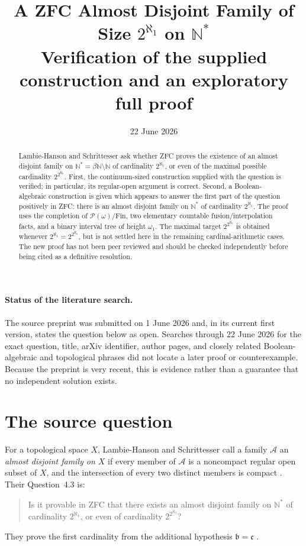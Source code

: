 \documentclass[11pt]{article}
\title{A ZFC Almost Disjoint Family of Size \(2^{\aleph_1}\) on \(\mathbb N^*\)\\
\large Verification of the supplied construction and an exploratory full proof}
\author{}
\date{22 June 2026}
\theoremstyle{definition}
\theoremstyle{remark}
\newcommand{\AD}{\mathcal A}
\begin{document}
\maketitle

\begin{abstract}
Lambie-Hanson and Schrittesser ask whether ZFC proves the existence of an
almost disjoint family on \(\mathbb N^*=\beta\mathbb N\setminus\mathbb N\)
of cardinality \(2^{\aleph_1}\), or even of the maximal possible cardinality
\(2^{2^{\aleph_0}}\).  First, the continuum-sized construction supplied with
the question is verified; in particular, its regular-open argument is correct.
Second, a Boolean-algebraic construction is given which appears to answer the
first part of the question positively in ZFC: there is an almost disjoint
family on \(\mathbb N^*\) of cardinality \(2^{\aleph_1}\).  The proof uses the
completion of \(\mathcal P(\omega)/\mathrm{Fin}\), two elementary countable
fusion/interpolation facts, and a binary interval tree of height \(\omega_1\).
The maximal target \(2^{2^{\aleph_0}}\) is obtained whenever
\(2^{\aleph_1}=2^{2^{\aleph_0}}\), but is not settled here in the remaining
cardinal-arithmetic cases.  The new proof has not been peer reviewed and should
be checked independently before being cited as a definitive resolution.
\end{abstract}

\paragraph{Status of the literature search.}
The source preprint was submitted on 1 June 2026 and, in its current first
version, states the question below as open.  Searches through 22 June 2026 for
the exact question, title, arXiv identifier, author pages, and closely related
Boolean-algebraic and topological phrases did not locate a later proof or
counterexample.  Because the preprint is very recent, this is evidence rather
than a guarantee that no independent solution exists.

\section{The source question}

For a topological space \(X\), Lambie-Hanson and Schrittesser call a family
\(\AD\) an \emph{almost disjoint family on \(X\)} if every member of \(\AD\)
is a noncompact regular open subset of \(X\), and the intersection of every
two distinct members is compact \cite[Definition~2.1]{LHS}.
Their Question~4.3 is:
\begin{quote}
Is it provable in ZFC that there exists an almost disjoint family on
\(\mathbb N^*\) of cardinality \(2^{\aleph_1}\), or even of cardinality
\(2^{2^{\aleph_0}}\)?
\end{quote}
They prove the first cardinality from the additional hypothesis
\(\mathfrak b=\mathfrak c\) \cite[Theorem~C]{LHS}.
\end{document}
